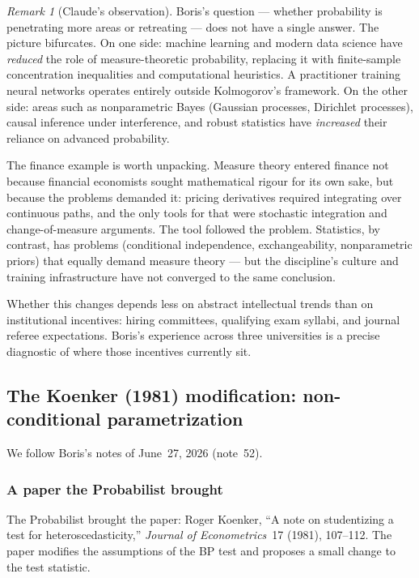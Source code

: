 \documentclass[a4paper,oneside,12pt]{extarticle}
\theoremstyle{plain}
\theoremstyle{definition}
\theoremstyle{remark}
\newtheorem{remark}[proposition]{Remark}
\begin{document}
\begin{remark}[Claude's observation]
Boris's question — whether probability is penetrating more areas or
retreating — does not have a single answer.  The picture bifurcates.
On one side: machine learning and modern data science have
\emph{reduced} the role of measure-theoretic probability, replacing
it with finite-sample concentration inequalities and computational
heuristics.  A practitioner training neural networks operates entirely
outside Kolmogorov's framework.  On the other side: areas such as
nonparametric Bayes (Gaussian processes, Dirichlet processes), causal
inference under interference, and robust statistics have
\emph{increased} their reliance on advanced probability.

The finance example is worth unpacking.  Measure theory entered
finance not because financial economists sought mathematical rigour
for its own sake, but because the problems demanded it: pricing
derivatives required integrating over continuous paths, and the only
tools for that were stochastic integration and change-of-measure
arguments.  The tool followed the problem.  Statistics, by contrast,
has problems (conditional independence, exchangeability, nonparametric
priors) that equally demand measure theory — but the discipline's
culture and training infrastructure have not converged to the same
conclusion.

Whether this changes depends less on abstract intellectual trends
than on institutional incentives: hiring committees, qualifying
exam syllabi, and journal referee expectations.  Boris's experience
across three universities is a precise diagnostic of where those
incentives currently sit.
\end{remark}


\subsection{The Koenker (1981) modification: non-conditional parametrization}
\label{subsec:koenker}

We follow Boris's notes of June~27, 2026 (note~52).

\subsubsection*{A paper the Probabilist brought}

The Probabilist brought the paper: Roger Koenker, ``A note on studentizing a test
for heteroscedasticity,'' \textit{Journal of Econometrics}~17 (1981),
107--112.  The paper modifies the assumptions of the BP test and
proposes a small change to the test statistic.
\end{document}

